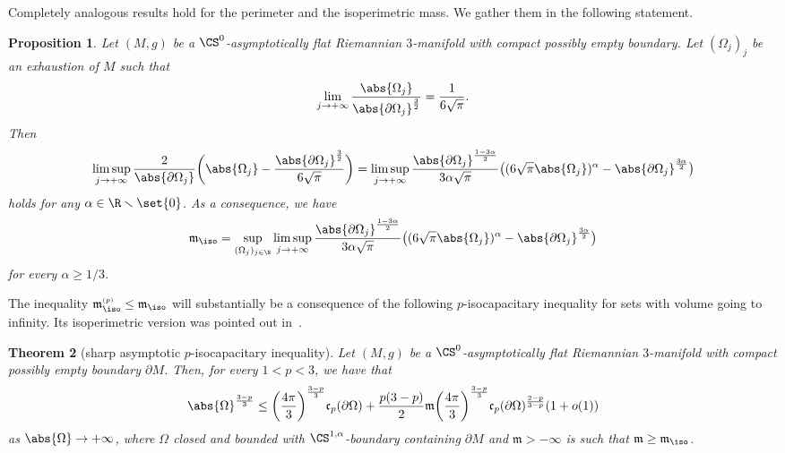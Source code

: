 \documentclass[10pt,a4paper]{amsart}
\numberwithin{equation}{section}
\newtheorem{Theorem}{Theorem}[section]
\newtheorem{Proposition}[Theorem]{Proposition}
\renewcommand{\ncapa}{\mathfrak{c}}
\newcommand{\ma}{\mathfrak{m}}
\newcommand{\tp}[1][p]{{\text{\tiny$(#1)$}}}
\begin{document}
Completely analogous results hold for the perimeter and the isoperimetric mass. We gather them in the following statement.
\begin{Proposition}%
 Let $(M,g)$ be a $\CS^0$-asymptotically flat Riemannian $3$-manifold with compact possibly empty boundary. Let $(\Omega_j)_j$ be an exhaustion of $M$ such that
 \begin{equation*}
 \lim_{j\to +\infty} \frac{ \abs{ \Omega_j}}{\abs{\partial \Omega_j}^{\frac{3}{2}}} = \frac{1}{6 \sqrt{\pi}}.
 \end{equation*}
 Then
 \begin{equation}
 \label{eq:equivalencesmassesformula}
\limsup_{j \to +\infty}\frac{2}{\abs{\partial \Omega_j}}\bigg( \abs{\Omega_j} -\frac{\abs{\partial \Omega_j}^{\frac{3}{2}}}{6 \sqrt{\pi}}\bigg) = \limsup_{j\to +\infty}\frac{\abs{ \partial \Omega_j}^{\frac{1-3 \alpha}{2}}}{3 \alpha \sqrt{\pi}} \big( (6 \sqrt{\pi}\abs{ \Omega_j})^{\alpha} - \abs{ \partial \Omega_j}^{ \frac{3\alpha}{2}} \big)
\end{equation}
holds for any $\alpha \in \R\smallsetminus\set{0}$.
As a consequence, we have
 \begin{equation*}%
 \ma_{\iso}= \sup_{(\Omega_j)_{j \in \N}} \limsup_{j \to +\infty}\frac{\abs{ \partial \Omega_j}^{\frac{1-3 \alpha}{2}}}{3 \alpha \sqrt{\pi}} \big( (6 \sqrt{\pi}\abs{ \Omega_j})^{\alpha} - \abs{ \partial \Omega_j}^{ \frac{3\alpha}{2}} \big)
 \end{equation*}
 for every $\alpha\geq 1/3$.
\end{Proposition}
The inequality $\ma^{\tp}_{\iso} \leq \ma_{\iso}$ will substantially be a consequence of the following $p$-isocapacitary inequality for sets with volume going to infinity. Its isoperimetric version was pointed out in~\cite[Corollary C.3]{chodosh_isoperimetryscalarcurvaturemass_2021}.
\begin{Theorem}[sharp asymptotic $p$-isocapacitary inequality]\label{thm:sharp-isopcapacitary}
 Let $(M,g)$ be a $\CS^0$-asymptotically flat Riemannian $3$-manifold with compact possibly empty boundary $\partial M$. Then, for every $1<p<3$, we have that \begin{equation}\label{eq:sharp_iso_p_capacitary_inequality}
 \abs{ \Omega}^{\frac{3-p}{3}}\leq \bigg( \frac{4 \pi }{3} \bigg)^{\frac{3-p}{3}} \ncapa_p(\partial \Omega)+\frac{p(3-p)}{2} \ma \bigg( \frac{4 \pi }{3} \bigg)^{\frac{3-p}{3}}\ncapa_p(\partial \Omega)^{\frac{2-p}{3-p}}(1+o(1))
 \end{equation}
 as $\abs{ \Omega} \to +\infty$, where $\Omega$ closed and bounded with $\CS^{1, \alpha}$-boundary containing $\partial M$ and $\ma>-\infty$ is such that $\ma\geq \ma_{\iso}$.
\end{Theorem}
\end{document}
